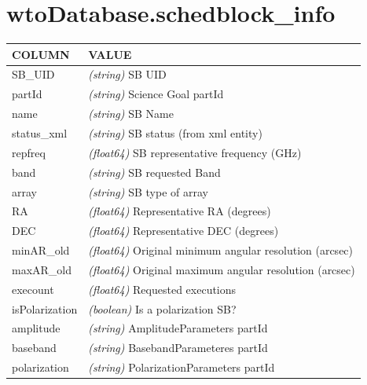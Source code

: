 \documentclass[a4paper,10pt,english]{sphinxmanual}
\begin{document}
\section{wtoDatabase.schedblock\_info}
\label{wtodata:wtodatabase-schedblock-info}
\begin{tabulary}{\linewidth}{|L|L|}
\hline
\textsf{\relax 
COLUMN
} & \textsf{\relax 
VALUE
}\\
\hline
SB\_UID
 & 
\emph{(string)} SB UID
\\

partId
 & 
\emph{(string)} Science Goal partId
\\

name
 & 
\emph{(string)} SB Name
\\

status\_xml
 & 
\emph{(string)} SB status (from xml entity)
\\

repfreq
 & 
\emph{(float64)} SB representative frequency (GHz)
\\

band
 & 
\emph{(string)} SB requested Band
\\

array
 & 
\emph{(string)} SB type of array
\\

RA
 & 
\emph{(float64)} Representative RA (degrees)
\\

DEC
 & 
\emph{(float64)} Representative DEC (degrees)
\\

minAR\_old
 & 
\emph{(float64)} Original minimum angular resolution (arcsec)
\\

maxAR\_old
 & 
\emph{(float64)} Original maximum angular resolution (arcsec)
\\

execount
 & 
\emph{(float64)} Requested executions
\\

isPolarization
 & 
\emph{(boolean)} Is a polarization SB?
\\

amplitude
 & 
\emph{(string)} AmplitudeParameters partId
\\

baseband
 & 
\emph{(string)} BasebandParameteres partId
\\

polarization
 & 
\emph{(string)} PolarizationParameters partId
\\


\end{tabulary}
\end{document}
